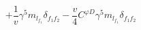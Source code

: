 %
\begin{dmath*}
%
  +  \frac{1}{v}\gamma^5 m_{l_{f_1}} \delta_{f_1 f_2}  -  \frac{v}{4}C^{ \varphi  D} \gamma^5 m_{l_{f_1}} \delta_{f_1 f_2}
%
\end{dmath*}
%
